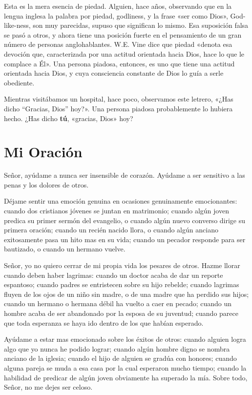 \documentclass[12pt, twoside, openright]{book}
\begin{document}
Esta es la mera esencia de piedad. Alguien, hace años, observando que en la lengua inglesa la palabra por piedad, godliness, y la frase «ser como Dios», God-like-ness, son muy parecidas, supuso que significan lo mismo. Esa suposición falsa se pasó a otros, y ahora tiene una posición fuerte en el pensamiento de un gran número de personas anglohablantes. W.E. Vine dice que piedad «denota esa devoción que, caracterizada por una actitud orientada hacia Dios, hace lo que le complace a Él». Una persona piadosa, entonces, es uno que tiene una actitud orientada hacia Dios, y cuya consciencia constante de Dios lo guía a serle obediente. 

Mientras visitábamos un hospital, hace poco, observamos este letrero, «¿Has dicho “Gracias, Dios” hoy?». Una persona piadosa probablemente lo hubiera hecho. ¿Has dicho \textbf{tú}, «gracias, Dios» hoy?

\section{Mi Oración}
Señor, ayúdame a nunca ser insensible de corazón. Ayúdame a ser sensitivo a las penas y los dolores de otros. 

Déjame sentir una emoción genuina en ocasiones genuinamente emocionantes: cuando dos cristianos jóvenes se juntan en matrimonio; cuando algún joven predica su primer sermón del evangelio, o cuando algún nuevo converso dirige su primera oración; cuando un recién nacido llora, o cuando algún anciano exitosamente pasa un hito mas en su vida; cuando un pecador responde para ser bautizado, o cuando un hermano vuelve.

Señor, yo no quiero cerrar de mi propia vida los pesares de otros. Hazme llorar cuando deben haber lagrimas: cuando un doctor acaba de dar un reporte espantoso; cuando padres se entristecen sobre su hijo rebelde; cuando lagrimas fluyen de los ojos de un niño sin madre, o de una madre que ha perdido sus hijos; cuando un hermano o hermana débil ha vuelto a caer en pecado; cuando un hombre acaba de ser abandonado por la esposa de su juventud; cuando parece que toda esperanza se haya ido dentro de los que habían esperado.

Ayúdame a estar mas emocionado sobre los éxitos de otros: cuando alguien logra algo que yo nunca he podido lograr; cuando algún hombre digno se nombra anciano de la iglesia; cuando el hijo de alguien se gradúa con honores; cuando alguna pareja se muda a esa casa por la cual esperaron mucho tiempo; cuando la habilidad de predicar de algún joven obviamente ha superado la mía. Sobre todo, Señor, no me dejes ser celoso. 
\end{document}

